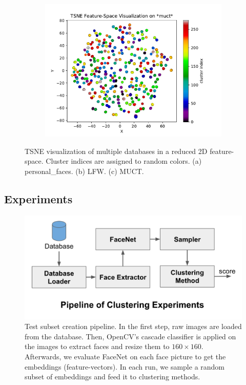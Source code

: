 \documentclass[conference]{IEEEtran}
\begin{document}
\begin{figure}
\begin{subfigure}[b]{0.5\textwidth}
    \includegraphics[width=\linewidth]{tsne_view_muct}
    \caption{}
  \end{subfigure}
  \caption{TSNE visualization of multiple databases in a reduced 2D feature-space. Cluster indices are assigned to random colors. (a) personal\_faces. (b) LFW. (c) MUCT.}
  \label{tsneview}
\end{figure}

\subsection{Experiments}

\begin{figure}
  \includegraphics[width=\linewidth]{pipeline.png}
  \caption{Test subset creation pipeline. In the first step, raw images are loaded from the database. Then, OpenCV's cascade classifier is applied on the images to extract faces and resize them to $160\times160$. Afterwards, we evaluate FaceNet on each face picture to get the embeddings (feature-vectors). In each run, we sample a random subset of embeddings and feed it to clustering methods.}
  \label{pipeline}
\end{figure}
\end{document}

